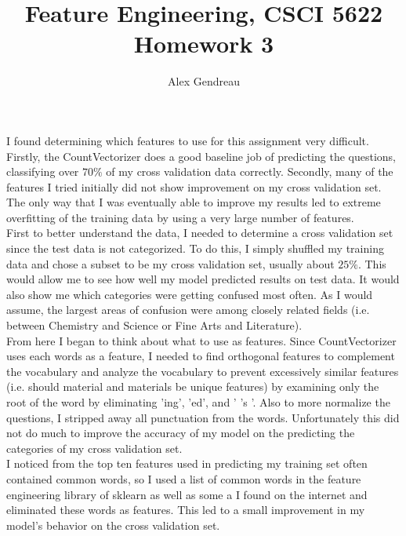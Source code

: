 \documentclass[110pt, oneside]{article}   	%
\title{Feature Engineering, CSCI 5622 Homework 3 }
\author{Alex Gendreau}
\begin{document}
\maketitle

I found determining which features to use for this assignment very difficult. Firstly, the CountVectorizer does a good baseline job of predicting the questions, classifying over $70\%$ of my cross validation data correctly. Secondly, many of the features I tried initially did not show improvement on my cross validation set. The only way that I was eventually able to improve my results led to extreme overfitting of the training data by using a very large number of features.\\

First to better understand the data, I needed to determine a cross validation set since the test data is not categorized.  To do this, I simply shuffled my training data and chose a subset to be my cross validation set, usually about $25\%$.  This would allow me to see how well my model predicted results on test data.  It would also show me which categories were getting confused most often.  As I would assume, the largest areas of confusion were among closely related fields (i.e. between Chemistry and Science or Fine Arts and Literature).  \\

From here I began to think about what to use as features.  Since CountVectorizer uses each words as a feature, I needed to find orthogonal features to complement the vocabulary and analyze the vocabulary to prevent excessively similar features (i.e. should material and materials be unique features) by examining only the root of the word by eliminating 'ing', 'ed', and ' 's '.  Also to more normalize the questions, I stripped away all punctuation from the words.  Unfortunately this did not do much to improve the accuracy of my model on the predicting the categories of my cross validation set. \\

I noticed from the top ten features used in predicting my training set often contained common words, so I used a list of common words in the feature engineering library of sklearn as well as some a I found on the internet and eliminated these words as features.  This led to a small improvement in my model's behavior on the cross validation set.\\
\end{document}

